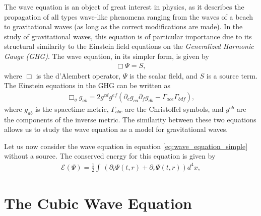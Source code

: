 The wave equation is an object of great interest in physics, as it describes the propagation of all types wave-like phenomena ranging from the waves of a beach to gravitational waves (as long as the correct modifications are made). In the study of gravitational waves, this equation is of particular importance due to its structural similarity to the Einstein field equations on the \textit{Generalized Harmonic Gauge (GHG)}. The wave equation, in its simpler form, is given by
%
\begin{align}
    \Box \Psi = S,
    \label{eq:wave_equation_simple}
\end{align}
%
where $\Box$ is the d'Alembert operator, $\Psi$ is the scalar field, and $S$ is a source term. The Einstein equations in the GHG can be written as
%
\begin{align}
    \Box_g g_{ab} = 2 g^{cd} g^{ef} (\partial_e g_{ca} \partial_f g_{db} - \Gamma_{ace} \Gamma_{bdf}),
\end{align}
%
where $g_{ab}$ is the spacetime metric, $\Gamma_{abc}$ are the Christoffel symbols, and $g^{ab}$ are the components of the inverse metric. The similarity between these two equations allows us to study the wave equation as a model for gravitational waves.

Let us now consider the wave equation in equation \eqref{eq:wave_equation_simple} without a source. The conserved energy for this equation is given by
%
\begin{align}
    \mathcal{E}(\Psi) = \frac{1}{2} \int \, \left( \partial_t \Psi(t,r) + \partial_r \Psi(t,r) \right) d^4x,
\end{align}


\section{The Cubic Wave Equation}
\label{section:cubic_wave_equation}